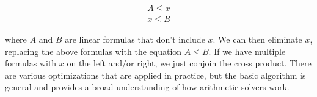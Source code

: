 \documentclass[11pt]{article}
\begin{document}
\[
\begin{array}{c}
A \leq x \\
x \leq B
\end{array}
\]

where $A$ and $B$ are linear formulas that don't include $x$. We can then
eliminate $x$, replacing the above formulas with the equation $A \leq B$. If we
have multiple formulas with $x$ on the left and/or right, we just conjoin the
cross product. There are various optimizations that are applied in practice, but
the basic algorithm is general and provides a broad understanding of how
arithmetic solvers work.
\end{document}
